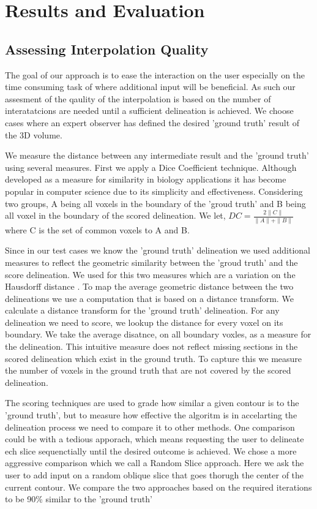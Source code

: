 \section{Results and Evaluation}
\label{sec:results}

\subsection{Assessing Interpolation Quality}
The goal of our approach is to ease the interaction on the user especially on the time consuming task of where additional input will be beneficial. As such our assesment of the qaulity of the interpolation is based on the number of interatatcions are needed until a sufficient delineation is achieved. We choose cases where an expert observer has defined the desired 'ground truth' result of the 3D volume. 

We measure the distance between any intermediate result and the 'ground truth' using several measures. First we apply a Dice Coefficient \cite{1945} technique. Although developed as a measure for similarity in biology applications it has become popular in computer science due to its simplicity and effectiveness. Considering two groups, A being all voxels in the boundary of the 'groud truth' and B being all voxel in the boundary of the scored delineation. 
We let, $ DC =\frac{2\|C\|}{\|A\|+\|B\|} $ where C is the set of common voxels to A and B.

Since in our test cases we know the 'ground truth' delineation we used additional measures to reflect the geometric similarity between the 'groud truth' and the score delineation. We used for this two measures which are a variation on the Hausdorff distance \cite{rockafellar2010variational}. To map the average geometric distance between the two delineations we use a computation that is based on a distance transform. We calculate a distance transform for the 'ground truth' delineation. For any delineation we need to score, we lookup the distance for every voxel on its boundary. We take the average disatnce, on all boundary voxles, as a measure for the delineation. This intuitive measure does not reflect missing sections in the scored delineation which exist in the ground truth. To capture this we measure the number of voxels in the ground truth that are not covered by the scored delineation.

The scoring techniques are used to grade how similar a given contour is to the 'ground truth', but to measure how effective the algoritm is in accelarting the delineation process we need to compare it to other methods. One comparison could be with a tedious apporach, which means requesting the user to delineate ech slice sequenctially until the desired outcome is achieved. We chose a more aggressive comparison which we call a Random Slice approach. Here we ask the user to add input on a random oblique slice that goes thorugh the center of the current contour. We compare the two approaches based on the required iterations to be 90\% similar to the 'ground truth'

